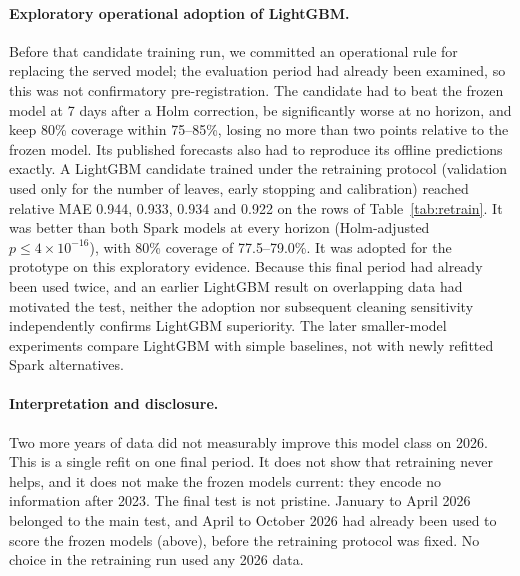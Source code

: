 \paragraph{Exploratory operational adoption of LightGBM.}
Before that candidate training run, we committed an operational rule for replacing the served model; the evaluation period had already been examined, so this was not confirmatory pre-registration. The candidate had to beat the frozen model at 7 days after a Holm correction, be significantly worse at no horizon, and keep 80\% coverage within 75--85\%, losing no more than two points relative to the frozen model. Its published forecasts also had to reproduce its offline predictions exactly.
A LightGBM candidate trained under the retraining protocol (validation used only for the number of leaves, early stopping and calibration) reached relative MAE 0.944, 0.933, 0.934 and 0.922 on the rows of Table~\ref{tab:retrain}. It was better than both Spark models at every horizon (Holm-adjusted $p\le4\times10^{-16}$), with 80\% coverage of 77.5--79.0\%. It was adopted for the prototype on this exploratory evidence.
Because this final period had already been used twice, and an earlier LightGBM result on overlapping data had motivated the test, neither the adoption nor subsequent cleaning sensitivity independently confirms LightGBM superiority. The later smaller-model experiments compare LightGBM with simple baselines, not with newly refitted Spark alternatives.

\paragraph{Interpretation and disclosure.}
Two more years of data did not measurably improve this model class on 2026.
This is a single refit on one final period. It does not show that retraining never helps, and it does not make the frozen models current: they encode no information after 2023.
The final test is not pristine. January to April 2026 belonged to the main test, and April to October 2026 had already been used to score the frozen models (above), before the retraining protocol was fixed. No choice in the retraining run used any 2026 data.

